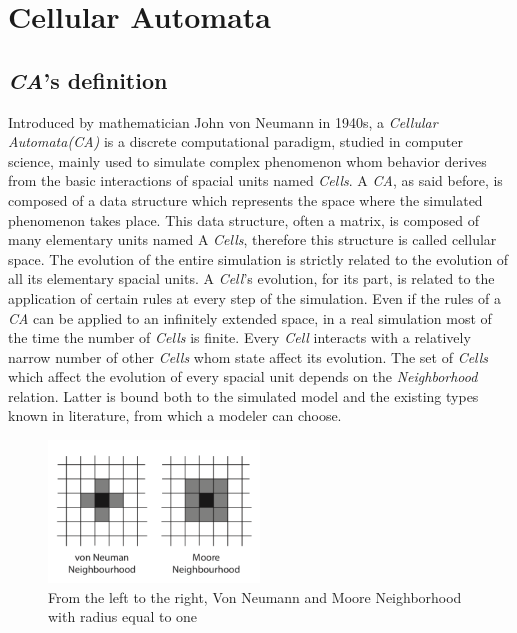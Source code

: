 \documentclass[12pt,a4paper,fleqn]{report}
\begin{document}
\chapter{Cellular Automata}
\section{\textit{CA}'s definition}
Introduced by mathematician John von Neumann in 1940s, a \textit{Cellular Automata(CA)} is a discrete computational paradigm, studied in computer science, mainly used to simulate complex phenomenon whom behavior derives from the basic interactions of spacial units named \textit{Cells}. A \textit{CA}, as said before, is composed of a  data structure which represents the space where the simulated phenomenon takes place. This data structure, often a matrix, is composed of many elementary units named A \textit{Cells}, therefore this structure is called cellular space. The evolution of the entire simulation is strictly related to the evolution of  all its elementary spacial units. A \textit{Cell}'s evolution, for its part, is related to the application of certain rules at every step of the simulation. Even if the rules of a \textit{CA} can be applied to an infinitely extended space, in a real simulation most of the time the number of \textit{Cells} is finite. Every \textit{Cell} interacts with a relatively narrow number of other \textit{Cells} whom state affect its evolution. The set of \textit{Cells} which affect the evolution of every spacial unit depends on the \textit{Neighborhood} relation. Latter is bound both to the simulated model and the existing types known in literature, from which a modeler can choose. \\

\begin{figure}[ht!]
\centering
    \includegraphics[width=0.5\textwidth]{neigh_types}
    \caption{  From the left to the right, Von Neumann and Moore Neighborhood  with radius equal to one \cite{1} }
\end{figure}
\end{document}
